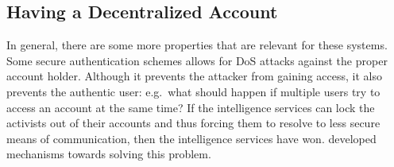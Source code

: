 \subsection{Having a Decentralized Account}
\label{passwd}

In general, there are some more properties that are relevant for these systems.
Some secure authentication schemes allows for \ac{DoS} attacks against the 
proper account holder.
Although it prevents the attacker from gaining access, it also prevents the 
authentic user:
e.g.\ what should happen if multiple users try to access an account at the same 
time?
If the intelligence services can lock the activists out of their accounts and 
thus forcing them to resolve to less secure means of communication, then the 
intelligence services have won.
\citet{P2PPasswords} developed mechanisms towards solving this problem.

